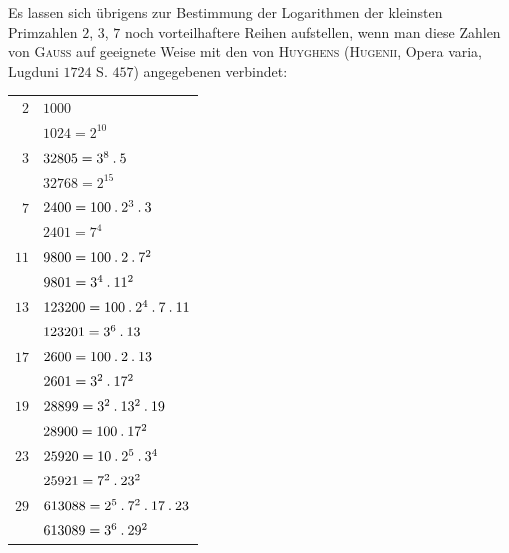Es lassen sich übrigens zur Bestimmung der Logarithmen der kleinsten Primzahlen $2$, $3$, $7$ noch vorteilhaftere Reihen aufstellen, wenn man diese Zahlen von \textsc{Gauss} auf geeignete Weise mit den von \textsc{Huyghens} (\textsc{Hugenii}, Opera varia, Lugduni $1724$ S. $457$) angegebenen verbindet:
\begingroup\renewcommand{\arraystretch}{1.15}
\begin{longtable}{@{}rl@{}}
$2$ & $1000$\\
 & $1024=2^{10}$\\
$3$ & $32805=3^8\mathbin{.} 5$\\
 & $32768=2^{15}$\\
$7$ & $2400=100\mathbin{.} 2^3\mathbin{.} 3$\\
 & $2401=7^4$\\
$11$ & $9800=100\mathbin{.} 2\mathbin{.} 7^2$\\
 & $9801=3^4\mathbin{.} 11^2$\\
$13$ & $123200=100\mathbin{.} 2^4\mathbin{.} 7\mathbin{.} 11$\\
 & $123201=3^6\mathbin{.} 13$\\
$17$ & $2600=100\mathbin{.} 2\mathbin{.} 13$\\
 & $2601=3^2\mathbin{.} 17^2$\\
$19$ & $28899=3^2\mathbin{.} 13^2\mathbin{.} 19$\\
 & $28900=100\mathbin{.} 17^2$\\
$23$ & $25920=10\mathbin{.} 2^5\mathbin{.} 3^4$\\
 & $25921=7^2\mathbin{.} 23^2$\\
$29$ & $613088=2^5\mathbin{.} 7^2\mathbin{.} 17\mathbin{.} 23$\\
 & $613089=3^6\mathbin{.} 29^2$\\
\end{longtable}\endgroup
